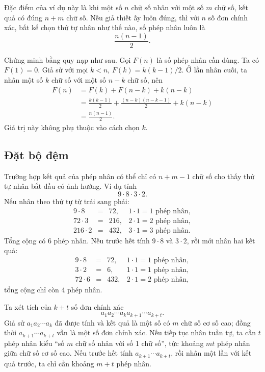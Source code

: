 \documentclass[11pt]{article}
\begin{document}
Đặc điểm của ví dụ này là khi một số \(n\) chữ số nhân với một số \(m\) chữ
số, kết quả có đúng \(n+m\) chữ số. Nếu giả thiết ấy luôn đúng, thì với \(n\)
số đơn chính xác, bất kể chọn thứ tự nhân như thế nào, số phép nhân luôn là
\[
  \frac{n(n-1)}{2}.
\]

Chứng minh bằng quy nạp như sau. Gọi \(F(n)\) là số phép nhân cần dùng. Ta có
\(F(1)=0\). Giả sử với mọi \(k<n\), \(F(k)=k(k-1)/2\). Ở lần nhân cuối, ta
nhân một số \(k\) chữ số với một số \(n-k\) chữ số, nên
\[
\begin{aligned}
F(n)
&=F(k)+F(n-k)+k(n-k)\\
&=\frac{k(k-1)}{2}
  +\frac{(n-k)(n-k-1)}{2}
  +k(n-k)\\
&=\frac{n(n-1)}{2}.
\end{aligned}
\]
Giá trị này không phụ thuộc vào cách chọn \(k\).

\subsection{Đặt bộ đệm}

Trường hợp kết quả của phép nhân có thể chỉ có \(n+m-1\) chữ số cho thấy thứ
tự nhân bắt đầu có ảnh hưởng. Ví dụ tính
\[
  9\cdot 8\cdot 3\cdot 2.
\]
Nếu nhân theo thứ tự từ trái sang phải:
\[
\begin{array}{rcll}
9\cdot 8 &=& 72, & 1\cdot 1=1 \text{ phép nhân},\\
72\cdot 3 &=& 216, & 2\cdot 1=2 \text{ phép nhân},\\
216\cdot 2 &=& 432, & 3\cdot 1=3 \text{ phép nhân}.
\end{array}
\]
Tổng cộng có 6 phép nhân. Nếu trước hết tính \(9\cdot 8\) và \(3\cdot 2\),
rồi mới nhân hai kết quả:
\[
\begin{array}{rcll}
9\cdot 8 &=& 72, & 1\cdot 1=1 \text{ phép nhân},\\
3\cdot 2 &=& 6, & 1\cdot 1=1 \text{ phép nhân},\\
72\cdot 6 &=& 432, & 2\cdot 1=2 \text{ phép nhân},
\end{array}
\]
tổng cộng chỉ còn 4 phép nhân.

Ta xét tích của \(k+t\) số đơn chính xác
\[
  a_1a_2\cdots a_k a_{k+1}\cdots a_{k+t}.
\]
Giả sử \(a_1a_2\cdots a_k\) đã được tính và kết quả là một số có \(m\) chữ số
cơ số cao; đồng thời \(a_{k+1}\cdots a_{k+t}\) vẫn là một số đơn chính xác.
Nếu tiếp tục nhân tuần tự, ta cần \(t\) phép nhân kiểu ``số \(m\) chữ số nhân
với số 1 chữ số'', tức khoảng \(mt\) phép nhân giữa chữ số cơ số cao. Nếu
trước hết tính \(a_{k+1}\cdots a_{k+t}\), rồi nhân một lần với kết quả trước,
ta chỉ cần khoảng \(m+t\) phép nhân.
\end{document}
